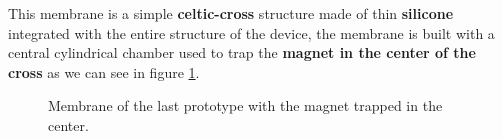 \begin{samepage}
    This membrane is a simple \textbf{celtic-cross} structure made of thin \textbf{silicone} integrated with the entire structure of the device, the membrane is built with a central cylindrical chamber used to trap the \textbf{magnet in the center of the cross} as we can see in figure \ref{fig: Membrane_trap}.
    \nopagebreak
    \begin{figure}[H]
        \centering
        \caption[Membrane mat]{Membrane of the last prototype with the magnet trapped in the center.}
        \label{fig: Membrane_trap}
    \end{figure}
\end{samepage}

